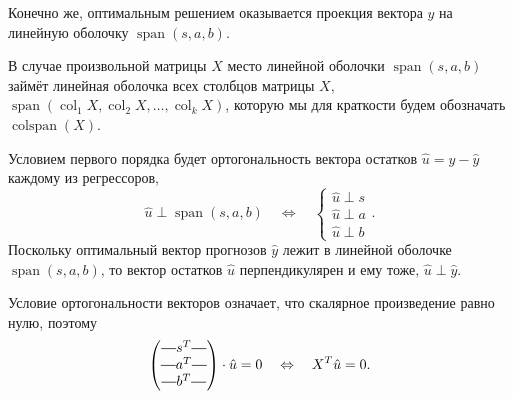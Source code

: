 \documentclass[12pt]{article}
\DeclareMathOperator{\col}{col}
\DeclareMathOperator{\colspan}{colspan}
\DeclareMathOperator{\Span}{span}
\newcommand*{\horzbar}{\rule[.5ex]{2.5ex}{0.5pt}}
\newcommand{\hu}{\hat{u}}
\newcommand{\hy}{\hat{y}}
\newcommand{\one}{s} %
\begin{document}
Конечно же, оптимальным решением оказывается проекция вектора $y$ на линейную оболочку $\Span(s, a, b)$.


В случае произвольной матрицы $X$ место линейной оболочки $\Span(s, a, b)$ 
займёт линейная оболочка всех столбцов матрицы $X$, $\Span(\col_1 X, \col_2 X, \dots, \col_k X)$, которую мы для краткости будем обозначать $\colspan(X)$.

Условием первого порядка будет ортогональность вектора остатков $\hu = y - \hy$ каждому из регрессоров,
\[
\hu \perp \Span(s, a, b) \quad \Leftrightarrow \quad \begin{cases}
    \hu \perp s \\
    \hu \perp a \\
    \hu \perp b
\end{cases}.
\]
Поскольку оптимальный вектор прогнозов $\hy$ лежит в линейной оболочке $\Span(s, a, b)$, то вектор остатков $\hu$ перпендикулярен и ему тоже, $\hu \perp \hy$.

Условие ортогональности векторов означает, что скалярное произведение равно нулю, поэтому
\[
\begin{pmatrix}
    \horzbar s^T \horzbar \\
    \horzbar a^T \horzbar \\
    \horzbar b^T \horzbar \\
\end{pmatrix} \cdot \hu = 0 \quad \Leftrightarrow \quad X^T \hu = 0.
\]
\end{document}
